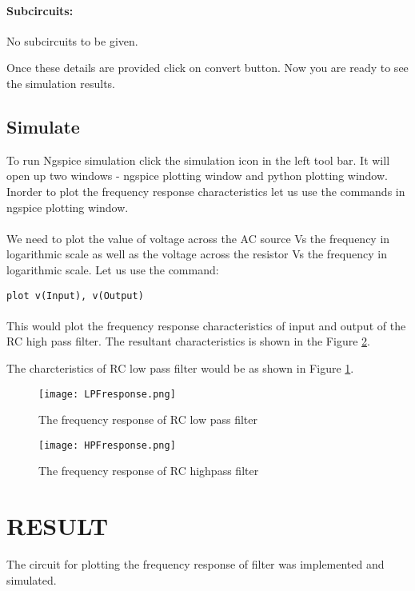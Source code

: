 \paragraph{Subcircuits:} No subcircuits to be given.

\noindent Once these details are provided click on convert button.  Now you are ready to see the simulation results.


\paragraph{}
\subsection{Simulate} To run Ngspice simulation click the simulation icon in the left tool bar. It will open up two windows - ngspice plotting window and python plotting window. Inorder to plot the frequency response characteristics let us use the commands in ngspice plotting window. 

\paragraph{}We need to plot the value of voltage across the AC source Vs the frequency in logarithmic scale as well as the voltage across the resistor Vs the frequency in logarithmic scale. Let us use the command:

\texttt{plot v(Input), v(Output) }

\paragraph{}

This would plot the frequency response characteristics of input and output of the RC high pass filter. The resultant characteristics is shown in the Figure \ref{HPFresponse}. 



The charcteristics of RC low pass filter would be as shown in Figure \ref{LPFresponse}.

\begin{figure}[h]
\centering
\texttt{[image: LPFresponse.png]}
\caption{The frequency response of RC low pass filter}
\label{LPFresponse}
\end{figure}

\begin{figure}[h]
\centering
\texttt{[image: HPFresponse.png]}
\caption{The frequency response of RC highpass filter}
\label{HPFresponse}
\end{figure}
\section*{RESULT}
The circuit for plotting the frequency response of filter was implemented and simulated.


